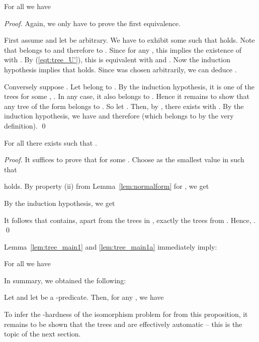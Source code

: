 \documentclass[envcountsame]{llncs}
\begin{document}
\begin{lemma}\label{lem:tree_main1}
  For all  we have
  
\end{lemma}

\begin{proof}
  Again, we only have to prove the first equivalence.

  First assume  and let
   be arbitrary. We have to exhibit some  such that
   holds. Note that  belongs to
   and therefore to . Since
   for any , this
  implies the existence of  with
  . By (\ref{eqt:tree_U'}), this is
  equivalent with  and . Now the
  induction hypothesis implies that  holds. Since
   was chosen arbitrarily, we can deduce .

  Conversely suppose . Let  belong to
  . By the induction hypothesis, it is one of
  the trees  for some , . In
  any case, it also belongs to . Hence it remains to
  show that any tree of the form  belongs to
  . So let . Then, by , there exists  with . By the
  induction hypothesis, we have 
  and therefore  (which belongs
  to  by the very definition).  \qed
\end{proof}

\begin{lemma}\label{lem:tree_main1a}
  For all  there exists
   such that
  .
\end{lemma}

\begin{proof}
It suffices to prove that
 for some
.
Choose  as the smallest value in 
such that

holds. By property (ii) from
Lemma~\ref{lem:normalform} for , we get

By the induction hypothesis, we get

It follows that  contains, apart from the
trees in , exactly
the trees from . Hence,
.
\qed
\end{proof}
Lemma~\ref{lem:tree_main1} and \ref{lem:tree_main1a} immediately imply:

\begin{lemma}\label{lem:tree_main2}
  For all  we have
  
\end{lemma}
In summary, we obtained the following:

\begin{proposition}\label{P-for-hardness}
  Let  and let  be a -predicate. Then, for
  any , we have
  
\end{proposition}
To infer the -hardness of the isomorphism problem for
 from this proposition, it remains to be shown that the trees
 and  are effectively automatic -- this is the
topic of the next section.
\end{document}
